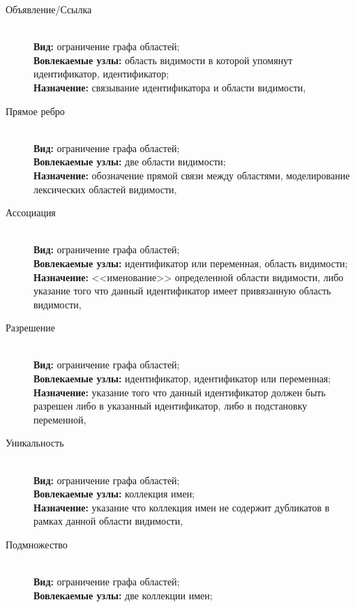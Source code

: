 \begin{description} \label{constraints-desc}
    \item[Объявление\slash Ссылка] \
        \\
        \textbf{Вид:} ограничение графа областей; \\
        \textbf{Вовлекаемые узлы:} область видимости в которой упомянут идентификатор, идентификатор; \\
        \textbf{Назначение:} связывание идентификатора и области видимости,
    \item[Прямое ребро] \
        \\
        \textbf{Вид:} ограничение графа областей; \\
        \textbf{Вовлекаемые узлы:} две области видимости; \\
        \textbf{Назначение:} обозначение прямой связи
        между областями, моделирование лексических областей видимости,
    \item[Ассоциация] \
        \\
        \textbf{Вид:} ограничение графа областей; \\
        \textbf{Вовлекаемые узлы:} идентификатор или переменная, область видимости; \\
        \textbf{Назначение:} <<именование>> определенной
        области видимости, либо указание того что данный идентификатор имеет привязанную область видимости,
    \item[Разрешение] \
        \\
        \textbf{Вид:} ограничение графа областей; \\
        \textbf{Вовлекаемые узлы:} идентификатор, идентификатор или переменная; \\
        \textbf{Назначение:} указание того что
        данный идентификатор должен быть разрешен либо в указанный идентификатор, либо в подстановку переменной, 
    \item[Уникальность] \
        \\
        \textbf{Вид:} ограничение графа областей; \\
        \textbf{Вовлекаемые узлы:} коллекция имен; \\
        \textbf{Назначение:} указание что коллекция имен не содержит дубликатов
        в рамках данной области видимости, 
    \item[Подмножество] \
        \\
        \textbf{Вид:} ограничение графа областей; \\
        \textbf{Вовлекаемые узлы:} две коллекции имен; \\

\end{description}
